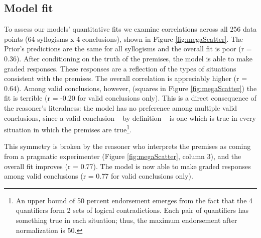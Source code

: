 \documentclass[10pt,letterpaper]{article}
\begin{document}
\subsection{Model fit}

To assess our models' quantitative fits we examine correlations across all 256 data points (64 syllogisms x 4 conclusions), shown in Figure \ref{fig:megaScatter}.
%
The Prior's predictions are the same for all syllogisms and the overall fit is poor (r = 0.36).  After conditioning on the truth of the premises, the model is able to make graded responses. These responses are a reflection of the types of situations consistent with the premises. The overall correlation is appreciably higher (r = 0.64). Among valid conclusions, however, (squares in Figure \ref{fig:megaScatter}) the fit is terrible (r = -0.20 for valid conclusions only). This is a direct consequence of the reasoner's literalness: the model has no preference among multiple valid conclusions, since a valid conclusion -- by definition -- is one which is true in every situation in which the premises are true\footnote{An upper bound of 50 percent endorsement emerges from the fact that the 4 quantifiers form 2 sets of logical contradictions. Each pair of quantifiers has something true in each situation; thus, the maximum endorsement after normalization is 50.}.

This symmetry is broken by the reasoner who interprets the premises as coming from a pragmatic experimenter (Figure \ref{fig:megaScatter}, column 3), and the overall fit improves (r = 0.77). The model is now able to make graded responses among valid conclusions (r = 0.77 for valid conclusions only). 




\end{document}
